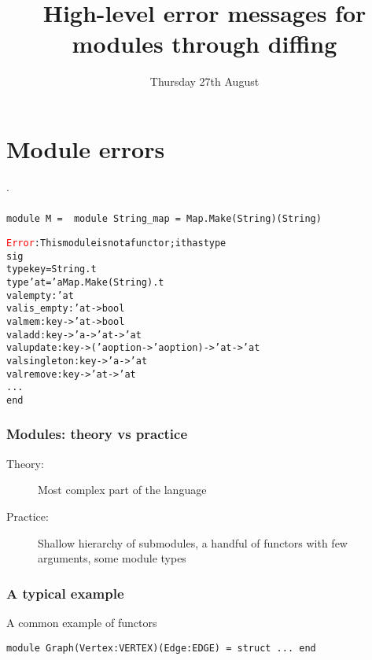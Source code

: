 \documentclass[a4paper,11pt]{beamer}
\title[Functor diffing]{High-level error messages for modules through diffing}
\author[Angeletti \& Radanne]{\texorpdfstring{
  \begin{columns}\column{0.5\linewidth}\centering%
  Florian \textsc{Angeletti}\\
  Inria\\
  \href{mailto:florian.angeletti@inria.fr}
  {\nolinkurl{florian.angeletti@inria.fr}}
  \column{0.5\linewidth}\centering%
  Gabriel \textsc{Radanne}\\
  Inria\\
  \href{mailto:gabriel.radanne@inria.fr}
  {\nolinkurl{gabriel.radanne@inria.fr}}
  \end{columns}
  }{F. Angeletti \& G. Radanne}}
\date{Thursday 27th August}
\newcommand{\error}[1]{\textcolor{red}{#1}}
\begin{document}
\begin{frame}
\maketitle
\end{frame}

\section{Module errors}

\begin{frame}
  .
\end{frame}

\begin{frame}[fragile]\frametitle{}

\begin{verbatim}
module M =  module String_map = Map.Make(String)(String)
\end{verbatim}

\begin{alltt}
\error{Error}: This module is not a functor; it has type
       sig
         type key = String.t
         type 'a t = 'a Map.Make(String).t
         val empty : 'a t
         val is_empty : 'a t -> bool
         val mem : key -> 'a t -> bool
         val add : key -> 'a -> 'a t -> 'a t
         val update : key -> ('a option -> 'a option) -> 'a t -> 'a t
         val singleton : key -> 'a -> 'a t
         val remove : key -> 'a t -> 'a t
         ...
       end
\end{alltt}

\end{frame}


\begin{frame}\frametitle{Modules: theory vs practice}
\begin{description}
\item[Theory:]{Most complex part of the language}
\item[Practice:]{Shallow hierarchy of submodules, a handful of functors with few arguments, some module types}
\end{description}

\end{frame}

\begin{frame}[fragile]\frametitle{A typical example}
A common example of functors
\begin{verbatim}
module Graph(Vertex:VERTEX)(Edge:EDGE) = struct ... end
\end{verbatim}

\end{frame}
\end{document}
